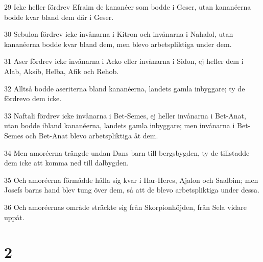 \par 29 Icke heller fördrev Efraim de kananéer som bodde i Geser, utan kananéerna bodde kvar bland dem där i Geser.
\par 30 Sebulon fördrev icke invånarna i Kitron och invånarna i Nahalol, utan kananéerna bodde kvar bland dem, men blevo arbetspliktiga under dem.
\par 31 Aser fördrev icke invånarna i Acko eller invånarna i Sidon, ej heller dem i Alab, Aksib, Helba, Afik och Rehob.
\par 32 Alltså bodde aseriterna bland kananéerna, landets gamla inbyggare; ty de fördrevo dem icke.
\par 33 Naftali fördrev icke invånarna i Bet-Semes, ej heller invånarna i Bet-Anat, utan bodde ibland kananéerna, landets gamla inbyggare; men invånarna i Bet-Semes och Bet-Anat blevo arbetspliktiga åt dem.
\par 34 Men amoréerna trängde undan Dans barn till bergsbygden, ty de tillstadde dem icke att komma ned till dalbygden.
\par 35 Och amoréerna förmådde hålla sig kvar i Har-Heres, Ajalon och Saalbim; men Josefs barns hand blev tung över dem, så att de blevo arbetspliktiga under dessa.
\par 36 Och amoréernas område sträckte sig från Skorpionhöjden, från Sela vidare uppåt.

\chapter{2}

